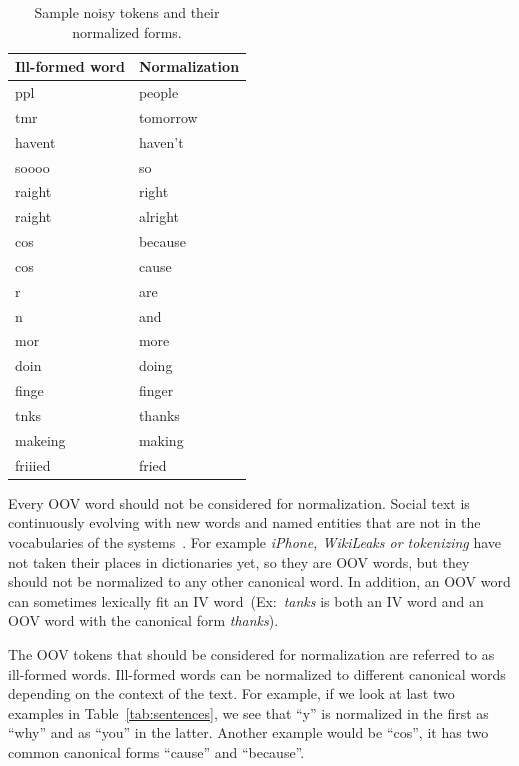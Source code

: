 \documentclass[a4paper,onesided,12pt]{report}
\begin{document}
\begin{table}[tbhp]
\caption{Sample noisy tokens and their normalized forms.}
\centering
\begin{tabular}[h]{|p{3.3cm}|p{3cm}|}
\hline
\textbf{Ill-formed word} & \textbf{Normalization} \\
\hline
ppl & people \\ \hline
tmr &   tomorrow \\ \hline
havent & haven't \\ \hline
soooo &  so \\ \hline
raight & right \\ \hline
raight & alright \\ \hline
cos & because \\ \hline
cos & cause \\ \hline
r  &  are \\ \hline
n &      and \\ \hline
mor &    more \\ \hline
doin &   doing \\ \hline
finge &  finger \\ \hline
tnks  & thanks \\ \hline
makeing & making \\ \hline
friiied &  fried \\ \hline
\end{tabular}
\label{tab:normalizations}
\end{table}

Every OOV word should not be considered for normalization. Social text is continuously evolving with new words and named entities that are not in the vocabularies of the systems~\cite{DBLP:conf/acl/HassanM13}. For example \textit{iPhone, WikiLeaks or tokenizing} have not taken their places in dictionaries yet, so they are OOV words, but they should not be normalized to any other canonical word. In addition, an OOV word can sometimes lexically fit an IV word~(Ex:~\textit{tanks} is both an IV word and an OOV word with the canonical form \textit{thanks}).

The OOV tokens that should be considered for normalization are referred to as ill-formed words. Ill-formed words can be normalized to different canonical words depending on the context of the text. For example, if we look at last two examples in Table~\ref{tab:sentences}, we see that ``y'' is normalized in the first as ``why'' and as ``you'' in the latter. Another example would be ``cos'', it has two common canonical forms ``cause'' and ``because''.
\end{document}

